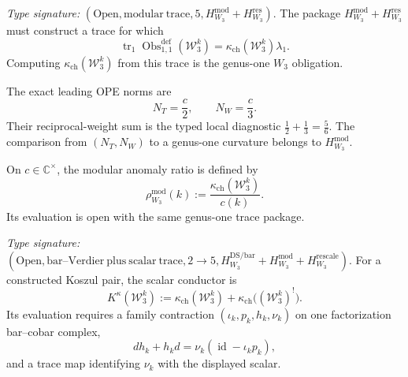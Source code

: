 \begin{theorem}
\label{thm:w3hol-kappa-formula}
\emph{Type signature:}
\((\mathrm{Open},\mathrm{modular\ trace},5,
H_{W_3}^{\mathrm{mod}}+H_{W_3}^{\mathrm{res}})\).
The package \(H_{W_3}^{\mathrm{mod}}+H_{W_3}^{\mathrm{res}}\) must
construct a trace for which
\begin{equation}\label{eq:w3hol-kappa-w3}
\operatorname{tr}_1
\operatorname{Obs}^{\mathrm{def}}_{1,1}(\mathcal W_3^k)
=\kappa_{\mathrm{ch}}(\mathcal W_3^k)\lambda_1.
\end{equation}
Computing \(\kappa_{\mathrm{ch}}(\mathcal W_3^k)\) from this trace is
the genus-one \(W_3\) obligation.
\end{theorem}

\begin{remark}
\label{rem:w3hol-channel-decomp}
The exact leading OPE norms are
\begin{equation}\label{eq:w3hol-kappa-channel}
N_T=\frac c2,\qquad N_W=\frac c3.
\end{equation}
Their reciprocal-weight sum is the typed local diagnostic
\(\frac12+\frac13=\frac56\).  The comparison
from \((N_T,N_W)\) to a genus-one curvature belongs to
\(H_{W_3}^{\mathrm{mod}}\).
\end{remark}

\begin{remark}
\label{rem:w3hol-anomaly-ratio}
On \(c\in\mathbb C^\times\), the modular anomaly ratio is defined by
\begin{equation}\label{eq:w3hol-rho}
\rho_{W_3}^{\mathrm{mod}}(k)
:=\frac{\kappa_{\mathrm{ch}}(\mathcal W_3^k)}{c(k)}.
\end{equation}
Its evaluation is open with the same genus-one trace package.
\end{remark}

\begin{theorem}
\label{thm:w3hol-kappa-sum}
\emph{Type signature:}
\((\mathrm{Open},\mathrm{bar\text{--}Verdier\ plus\ scalar\ trace},
2\to5,
H_{W_3}^{\mathrm{DS/bar}}+
H_{W_3}^{\mathrm{mod}}+
H_{W_3}^{\mathrm{rescale}})\).
For a constructed Koszul pair, the scalar conductor is
\begin{equation}\label{eq:w3hol-kappa-sum}
K^\kappa(\mathcal W_3^k)
:=
\kappa_{\mathrm{ch}}(\mathcal W_3^k)
+\kappa_{\mathrm{ch}}\bigl((\mathcal W_3^k)^!\bigr).
\end{equation}
Its evaluation requires a family contraction
\((\iota_k,p_k,h_k,\nu_k)\) on one factorization bar--cobar complex,
\[
dh_k+h_kd
=\nu_k(\operatorname{id}-\iota_kp_k),
\]
and a trace map identifying \(\nu_k\) with the displayed scalar.
\end{theorem}

